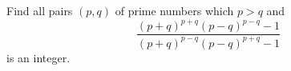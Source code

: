 Find all pairs 
$(p,q)$
 of prime numbers which 
$p >q$
 and
$$\frac{(p+q)^{p+q}(p-q)^{p-q}-1}{(p+q)^{p-q}(p-q)^{p+q}-1}$$
is an integer.

